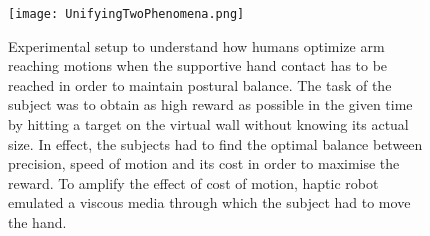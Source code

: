 \begin{figure}
\centering
\texttt{[image: UnifyingTwoPhenomena.png]}
\caption{Experimental setup to understand how humans optimize arm reaching motions when the supportive hand contact has to be reached in order to maintain postural balance. The task of the subject was to obtain as high reward as possible in the given time by hitting a target on the virtual wall without knowing its actual size. In effect, the subjects had to find the optimal balance between precision, speed of motion and its cost in order to maximise the reward. To amplify the effect of cost of motion, haptic robot emulated a viscous media through which the subject had to move the hand.
}
\label{fig:UnifyingTwoPhenomena}
\end{figure}




